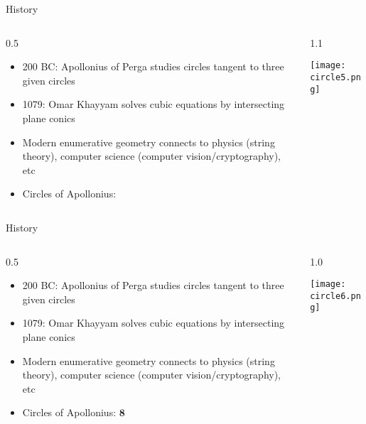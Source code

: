 \documentclass{beamer}
\theoremstyle{definition}
\begin{document}
                                        \begin{frame}{History}

      \begin{columns}[c]
        \begin{column}{0.5\hsize}
      
          \begin{itemize}
          \item {\texttildelow}200 BC: Apollonius of Perga studies circles tangent to three
            given circles
          \item {\texttildelow}1079: Omar Khayyam solves cubic equations by intersecting
            plane conics
          \item Modern enumerative geometry connects to physics (string theory),
            computer science (computer vision/cryptography), etc
            \item Circles of Apollonius:
          \end{itemize}
        \end{column}
        \begin{column}{1.1\hsize}

            \texttt{[image: circle5.png]}

        \end{column}
      \end{columns}
                                        \end{frame}

                                                \begin{frame}{History}

      \begin{columns}[c]
        \begin{column}{0.5\hsize}
      
          \begin{itemize}
          \item {\texttildelow}200 BC: Apollonius of Perga studies circles tangent to three
            given circles
          \item {\texttildelow}1079: Omar Khayyam solves cubic equations by intersecting
            plane conics
          \item Modern enumerative geometry connects to physics (string theory),
            computer science (computer vision/cryptography), etc
            \item Circles of Apollonius: {\color{red}$\mathbf{8}$}
          \end{itemize}
        \end{column}
        \begin{column}{1.0\hsize}

            \texttt{[image: circle6.png]}

        \end{column}
      \end{columns}
                                                \end{frame}
\end{document}
